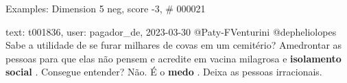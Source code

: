 \begin{frame}{Examples: Dimension 5 neg, score -3, \# 000021}
\footnotesize
\begin{alertblock}{text: t001836, user: pagador\_de, 2023-03-30}
@Paty-FVenturini @depheliolopes Sabe a utilidade de se furar milhares de covas 
em um cemitério? Amedrontar as pessoas para que elas não pensem e acredite em 
vacina milagrosa e \textbf{isolamento} \textbf{social} . Consegue entender? 
Não. É o \textbf{medo} . Deixa as pessoas irracionais. 
\end{alertblock}
\end{frame}
